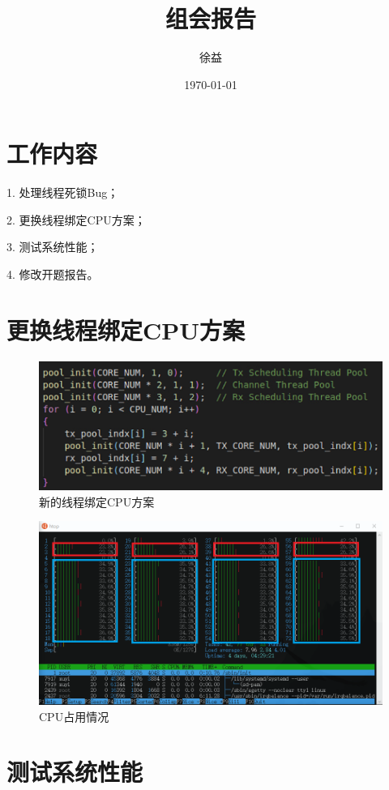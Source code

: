 \documentclass{article}
\title{组会报告}
\author{徐益}
\date{\today}
\begin{document}
\maketitle


\section{工作内容}
1. 处理线程死锁Bug；

2. 更换线程绑定CPU方案；

3. 测试系统性能；

4. 修改开题报告。

\section{更换线程绑定CPU方案}
\begin{figure}[H]
	\centering
	\includegraphics[width = .6\textwidth]{pool.png}
	\caption{新的线程绑定CPU方案}
\end{figure}
\begin{figure}[H]
	\centering
	\includegraphics[width = .8\textwidth]{htop.png}
	\caption{CPU占用情况}
\end{figure}

\section{测试系统性能}
\end{document}
